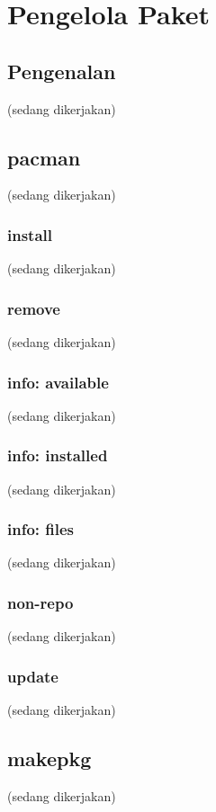\documentclass[12pt,]{article}
\begin{document}
	\newpage
	\section{Pengelola Paket}

	\subsection{Pengenalan}
	(sedang dikerjakan)

	\subsection{pacman}
	(sedang dikerjakan)

	\subsubsection{install}
	(sedang dikerjakan)

	\subsubsection{remove}
	(sedang dikerjakan)

	\subsubsection{info: available}
	(sedang dikerjakan)

	\subsubsection{info: installed}
	(sedang dikerjakan)

	\subsubsection{info: files}
	(sedang dikerjakan)

	\subsubsection{non-repo}
	(sedang dikerjakan)

	\subsubsection{update}
	(sedang dikerjakan)

	\subsection{makepkg}
	(sedang dikerjakan)
\end{document}
